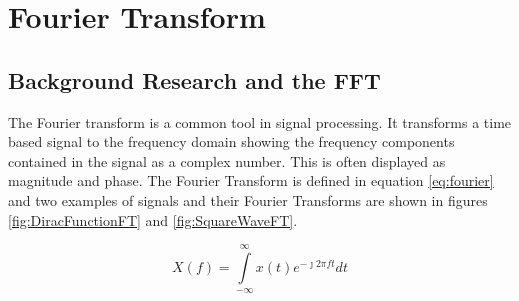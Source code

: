 \section{Fourier Transform}
\subsection{Background Research and the FFT}
The Fourier transform is a common tool in signal processing. It transforms a time based signal to the frequency domain showing the frequency components contained in the signal as a complex number. This is often displayed as magnitude and phase. The Fourier Transform is defined in equation \eqref{eq:fourier} and two examples of signals and their Fourier Transforms are shown in figures \ref{fig:DiracFunctionFT} and \ref{fig:SquareWaveFT}. 
 
\begin{equation}\label{eq:fourier}
X(f) = \int\limits_{-\infty}^{\infty}x(t)e^{-\jmath 2 \pi ft}dt
\end{equation}

